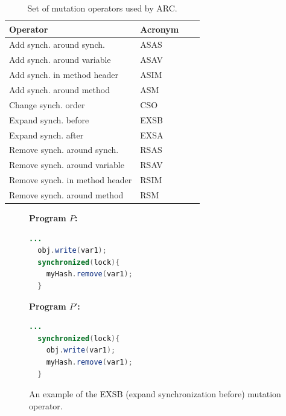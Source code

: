 \documentclass{llncs}
\begin{document}
\begin{table}[h]
\caption{Set of mutation operators used by ARC.}
\begin{center}
\begin{tabular}{|l|l|c|c|}
\hline
\textbf{Operator} & \textbf{Acronym} \\
\hline
Add synch. around synch. & ASAS \\
\hline
Add synch. around variable & ASAV \\
\hline
Add synch. in method header & ASIM \\
\hline
Add synch. around method & ASM  \\
\hline
Change synch. order & CSO  \\
\hline
Expand synch. before & EXSB  \\
\hline
Expand synch. after & EXSA  \\
\hline
Remove synch. around synch. & RSAS  \\
\hline
Remove synch. around variable & RSAV  \\
\hline
Remove synch. in method header & RSIM  \\
\hline
Remove synch. around method & RSM  \\
\hline
\end{tabular}
\label{tbl:operators}
\end{center}
\end{table}

\begin{figure}[h]
\vspace{2mm}
\begin{minipage}{5cm}

\footnotesize{\textbf{ Program $P$:}}
\begin{lstlisting}[language=Java, morekeywords={synchronize}]
  ...
  obj.write(var1);
  synchronized(lock){
    myHash.remove(var1);
  }
\end{lstlisting}
\end{minipage}\hfill
\begin{minipage}{5cm}
\footnotesize{\textbf{ Program $P'$:}}
\begin{lstlisting}[language=Java, morekeywords={synchronize}]
  ...
  synchronized(lock){
    obj.write(var1);
    myHash.remove(var1);
  }
\end{lstlisting}
\end{minipage}

\caption{An example of the EXSB (expand synchronization before) mutation
operator.}
\label{fig:EXSB_example}
\end{figure}
\end{document}
